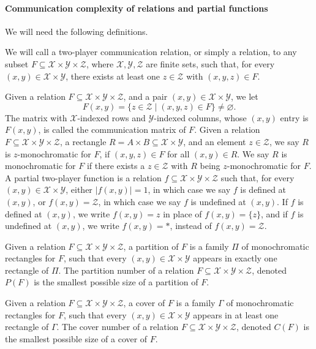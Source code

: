 \paragraph{Communication complexity of relations and partial functions}
We will need the following definitions.
\begin{ntdefinition}
We will call a two-player communication relation, or simply a relation, to any subset $F\subseteq\mathcal X\times\mathcal Y\times\mathcal Z$, where $\mathcal X,\mathcal Y,\mathcal Z$ are finite sets, such that, for every $(x,y)\in\mathcal X\times\mathcal Y$, there exists at least one $z\in\mathcal Z$ with $(x,y,z)\in F$.
\end{ntdefinition}
Given a relation $F\subseteq\mathcal X\times\mathcal Y\times\mathcal Z$, and a pair $(x,y)\in\mathcal X\times\mathcal Y$, we let
\[F(x,y)=\{z\in\mathcal Z\mid(x,y,z)\in F\}\ne\varnothing.\]
The matrix with $\mathcal X$-indexed rows and $\mathcal Y$-indexed columns, whose $(x,y)$ entry is $F(x,y)$, is called the communication matrix of $F$.
Given a relation $F\subseteq\mathcal X\times\mathcal Y\times\mathcal Z$, a rectangle $R=A\times B\subseteq\mathcal X\times\mathcal Y$, and an element $z\in\mathcal Z$, we say $R$ is $z$-monochromatic for $F$, if $(x,y,z)\in F$ for all $(x,y)\in R$. We say $R$ is monochromatic for $F$ if there exists a $z\in\mathcal Z$ with $R$ being $z$-monochromatic for $F$.
A partial two-player function is a relation $f\subseteq\mathcal X\times\mathcal Y\times\mathcal Z$ such that, for every $(x,y)\in\mathcal X\times\mathcal Y$, either $|f(x,y)|=1$, in which case we say $f$ is defined at $(x,y)$, or $f(x,y)=\mathcal Z$, in which case we say $f$ is undefined at $(x,y)$. If $f$ is defined at $(x,y)$, we write $f(x,y)=z$ in place of $f(x,y)=\{z\}$, and if $f$ is undefined at $(x,y)$, we write $f(x,y)=*$, instead of $f(x,y)=\mathcal Z$.
\begin{ntdefinition}
Given a relation $F\subseteq\mathcal X\times\mathcal Y\times\mathcal Z$, a partition of $F$ is a family $\Pi$ of monochromatic rectangles for $F$, such that every $(x,y)\in\mathcal X\times\mathcal Y$ appears in exactly one rectangle of $\Pi$. The partition number of a relation $F\subseteq\mathcal X\times\mathcal Y\times\mathcal Z$, denoted $P(F)$ is the smallest possible size of a partition of $F$.
\end{ntdefinition}
\begin{ntdefinition}
Given a relation $F\subseteq\mathcal X\times\mathcal Y\times\mathcal Z$, a cover of $F$ is a family $\Gamma$ of monochromatic rectangles for $F$, such that every $(x,y)\in\mathcal X\times\mathcal Y$ appears in at least one rectangle of $\Gamma$. The cover number of a relation $F\subseteq\mathcal X\times\mathcal Y\times\mathcal Z$, denoted $C(F)$ is the smallest possible size of a cover of $F$.
\end{ntdefinition}
